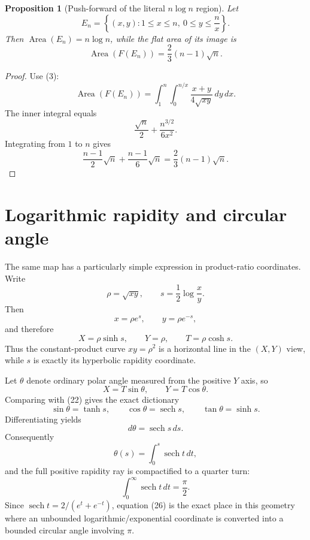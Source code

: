 \documentclass[11pt]{amsart}
\newtheorem{proposition}{Proposition}
\theoremstyle{remark}
\begin{document}
\begin{proposition}[Push-forward of the literal $n\log n$ region]\label{prop:nlognimage}
Let
\[
E_n=\left\{(x,y):1\le x\le n,\ 0\le y\le\frac n x\right\}.
\]
Then $\operatorname{Area}(E_n)=n\log n$, while the flat area of its image is
\begin{equation}
\boxed{
\operatorname{Area}(F(E_n))
=\frac23(n-1)\sqrt n.}
\tag{19}
\end{equation}
\end{proposition}

\begin{proof}
Use (3):
\[
\operatorname{Area}(F(E_n))
=\int_1^n\int_0^{n/x}
\frac{x+y}{4\sqrt{xy}}\,dy\,dx.
\]
The inner integral equals
\[
\frac{\sqrt n}{2}+\frac{n^{3/2}}{6x^2}.
\]
Integrating from $1$ to $n$ gives
\[
\frac{n-1}{2}\sqrt n+\frac{n-1}{6}\sqrt n
=\frac23(n-1)\sqrt n.
\]
\end{proof}

\section{Logarithmic rapidity and circular angle}
The same map has a particularly simple expression in product-ratio coordinates. Write
\begin{equation}
\rho=\sqrt{xy},\qquad
s=\frac12\log\frac{x}{y}. \tag{20}
\end{equation}
Then
\begin{equation}
x=\rho e^s,\qquad y=\rho e^{-s}, \tag{21}
\end{equation}
and therefore
\begin{equation}
\boxed{
X=\rho\sinh s,\qquad
Y=\rho,\qquad
T=\rho\cosh s.}
\tag{22}
\end{equation}
Thus the constant-product curve $xy=\rho^2$ is a horizontal line in the $(X,Y)$ view, while $s$ is exactly its hyperbolic rapidity coordinate.

Let $\theta$ denote ordinary polar angle measured from the positive $Y$ axis, so
\[
X=T\sin\theta,\qquad Y=T\cos\theta.
\]
Comparing with (22) gives the exact dictionary
\begin{equation}
\boxed{
\sin\theta=\tanh s,\qquad
\cos\theta=\operatorname{sech}s,\qquad
\tan\theta=\sinh s.}
\tag{23}
\end{equation}
Differentiating yields
\begin{equation}
\boxed{d\theta=\operatorname{sech}s\,ds.}\tag{24}
\end{equation}
Consequently
\begin{equation}
\boxed{
\theta(s)=\int_0^s\operatorname{sech}t\,dt,}
\tag{25}
\end{equation}
and the full positive rapidity ray is compactified to a quarter turn:
\begin{equation}
\boxed{
\int_0^{\infty}\operatorname{sech}t\,dt=\frac\pi2.}
\tag{26}
\end{equation}
Since $\operatorname{sech}t=2/(e^t+e^{-t})$, equation (26) is the exact place in this geometry where an unbounded logarithmic/exponential coordinate is converted into a bounded circular angle involving $\pi$.
\end{document}
